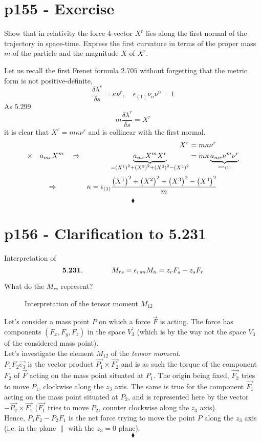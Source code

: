 \section{p155 - Exercise}
\begin{tcolorbox}
Show that in relativity the force $4$-vector $X^r$ lies along the first normal of the trajectory in space-time. Express the first curvature in terms of the proper mass $m$ of the particle and the magnitude $X$ of $ X^r$.
\end{tcolorbox}
Let us recall the first Frenet formula $\mathbf{2.705}$ without forgetting that the metric form is not positive-definite, $$\frac{\delta \lambda^r}{\delta s}=\kappa\nu^r,\quad \epsilon_{(1)}\nu_n\nu^n=1$$ As $\mathbf{5.299}$ $$m\frac{\delta \lambda^r}{\delta s}=X^r$$ it is clear that $X^r = m\kappa\nu^r$ and is collinear with the first normal.
\begin{align}
X^r &= m\kappa\nu^r\\
\times \quad a_{mr}X^m\quad\Rightarrow\quad\quad\quad\quad \underbrace{a_{mr}X^mX^r}_{=\left(X^1\right)^2+\left(X^2\right)^2+\left(X^3\right)^2-\left(X^4\right)^2} &= m\kappa \underbrace{a_{mr}\nu^m\nu^r}_{= \epsilon_{(1)}}
\end{align}
\textbf{$$\Rightarrow\quad\quad\quad\quad \kappa = \epsilon_{(1)}\frac{\left(X^1\right)^2+\left(X^2\right)^2+\left(X^3\right)^2-\left(X^4\right)^2}{m}
$$}
$$\blacklozenge$$
\newpage


\section{p156 - Clarification to 5.231}
\begin{tcolorbox}
Interpretation of 
$$\mathbf{5.231.}\quad\quad\quad\quad M_{rs}=\epsilon_{rsn}M_n=z_rF_s-z_sF_r$$
\end{tcolorbox}
What do the $M_{rs}$ represent?
\begin{figure}[H]

\caption{Interpretation of the tensor moment $M_{12}$}
\label{fig:fig_p156_5320}
\end{figure}
Let's consider a mass point $P$ on which a force $\overrightarrow{F}$ is acting. The force has components $\left(F_x,F_y,F_z\right)$ in the  space $V^{'}_3$ (which is by the way not the space $V_3$ of the considered mass point).\\
Let's investigate the element $M_{12}$ of the \textit{tensor moment}.\\
$P_1F_2\overrightarrow{e_3}$ is the vector product $\overrightarrow{P_1}\times\overrightarrow{F_2}$ and is as such the torque of the component $F_2$ of $\overrightarrow{F}$ acting on the mass point situated at $P_1$. The origin being fixed, $\overrightarrow{F_2}$ tries to move $P_1$, clockwise along the $z_3$ axis. The same is true for the component $\overrightarrow{F_1}$ acting on the mass point situated at $P_2$, and is represented here by the vector $- \overrightarrow{P_2}\times\overrightarrow{F_1}$ ($\overrightarrow{F_1}$ tries to move  $P_2$, counter clockwise along the $z_3$ axis). \\
Hence, $P_1F_2-P_2F_1$ is the net force trying to move the point $P$ along the $z_3$ axis (i.e. in the plane $\parallel$ with the $z_3=0$ plane).
$$\blacklozenge$$
\newpage


